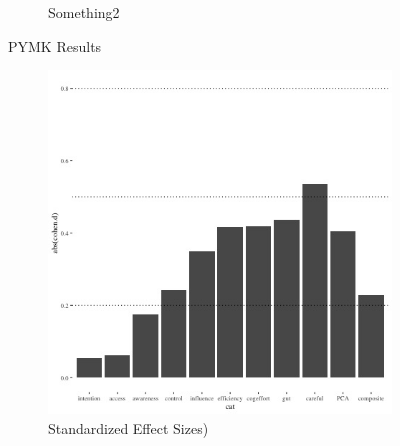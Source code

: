 \documentclass[12pt,letterpaper]{article}
\begin{document}
\begin{figure}[ht]
\begin{subfigure}{.5\textwidth}
        \caption{Something2}
        \label{fig:sub-second}
    \end{subfigure}
\caption{PYMK Results}
\end{figure}


\begin{figure}
    \begin{subfigure}{.5\textwidth} 
        \centering
        \includegraphics[width=1\linewidth]{Output/Graphs/Experiments/Automaticity/standardized effect sizes.jpg} 
        \caption{Standardized Effect Sizes)}
        \label{fig:sub-first}
    \end{subfigure}
    \begin{subfigure}{.5\textwidth} 
        \centering

\end{subfigure}
\end{figure}
\end{document}
